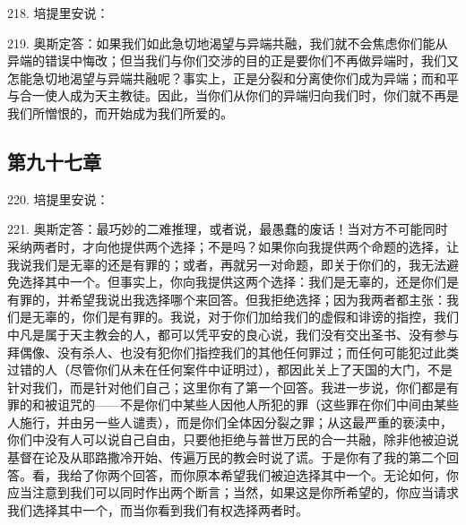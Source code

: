 218. 培提里安说：\par

219. 奥斯定答：如果我们如此急切地渴望与异端共融，我们就不会焦虑你们能从异端的错误中悔改；但当我们与你们交涉的目的正是要你们不再做异端时，我们又怎能急切地渴望与异端共融呢？事实上，正是分裂和分离使你们成为异端；而和平与合一使人成为天主教徒。因此，当你们从你们的异端归向我们时，你们就不再是我们所憎恨的，而开始成为我们所爱的。\par


\subsection{第九十七章}

220. 培提里安说：\par

221. 奥斯定答：最巧妙的二难推理，或者说，最愚蠢的废话！当对方不可能同时采纳两者时，才向他提供两个选择；不是吗？如果你向我提供两个命题的选择，让我说我们是无辜的还是有罪的；或者，再就另一对命题，即关于你们的，我无法避免选择其中一个。但事实上，你向我提供这两个选择：我们是无辜的，还是你们是有罪的，并希望我说出我选择哪个来回答。但我拒绝选择；因为我两者都主张：我们是无辜的，你们是有罪的。我说，对于你们加给我们的虚假和诽谤的指控，我们中凡是属于天主教会的人，都可以凭平安的良心说，我们没有交出圣书、没有参与拜偶像、没有杀人、也没有犯你们指控我们的其他任何罪过；而任何可能犯过此类过错的人（尽管你们从未在任何案件中证明过），都因此关上了天国的大门，不是针对我们，而是针对他们自己；这里你有了第一个回答。我进一步说，你们都是有罪的和被诅咒的——不是你们中某些人因他人所犯的罪（这些罪在你们中间由某些人施行，并由另一些人谴责），而是你们全体因分裂之罪；从这最严重的亵渎中，你们中没有人可以说自己自由，只要他拒绝与普世万民的合一共融，除非他被迫说基督在论及从耶路撒冷开始、传遍万民的教会时说了谎。于是你有了我的第二个回答。看，我给了你两个回答，而你原本希望我们被迫选择其中一个。无论如何，你应当注意到我们可以同时作出两个断言；当然，如果这是你所希望的，你应当请求我们选择其中一个，而当你看到我们有权选择两者时。\par

